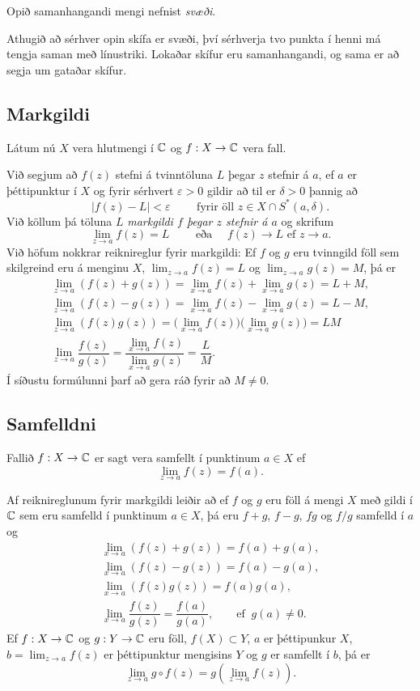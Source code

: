 Opið samanhangandi mengi nefnist {\it svæði}.  


Athugið að sérhver opin skífa er svæði, því sérhverja tvo punkta í
henni má
tengja saman með línustriki.  Lokaðar skífur eru samanhangandi,
og sama er að segja um gataðar skífur.


\subsection*{Markgildi}

Látum nú $X$ vera hlutmengi í ${\mathbb C}$ og $f:X\to {\mathbb C}$ vera fall.  

Við segjum að $f(z)$ stefni á tvinntöluna $L$ þegar  $z$ stefnir á
$a$,  ef $a$ er
þéttipunktur í $X$ og fyrir sérhvert $\varepsilon>0$ gildir að til er
$\delta>0$ þannig að 
$$
|f(z)-L|<\varepsilon \qquad \text{ fyrir öll } z\in X\cap S^*(a,\delta).
$$
Við köllum þá töluna $L$ {\it markgildi $f$ þegar $z$ stefnir á $a$}
og skrifum 
$$
\lim_{z\to a}f(z)=L  \qquad \text{ eða } \quad f(z)\to L \text{ ef }
z\to a.
$$
Við höfum nokkrar reiknireglur fyrir markgildi:  Ef $f$ og $g$ eru
tvinngild föll sem skilgreind eru á menginu $X$, $\lim_{z\to a}f(z)=L$
og $\lim_{z\to a}g(z)=M$, þá er 
\begin{gather*}
\lim_{z\to a}(f(z)+g(z))=\lim_{x\to a}f(z)+\lim_{x\to a}g(z)=L+M,\\
\lim_{z\to a}(f(z)-g(z))=\lim_{x\to a}f(z)-\lim_{x\to a}g(z)=L-M,\\
\lim_{z\to a}(f(z)g(z))=\big(\lim_{x\to a}f(z)\big)\big(\lim_{x\to
a}g(z)\big)=LM\\
\lim_{z\to a}\dfrac{f(z)}{g(z)}=\dfrac{\lim_{x\to a}f(z)}{\lim_{x\to
a}g(z)}=\dfrac LM.
\end{gather*}
Í síðustu formúlunni þarf að gera ráð fyrir að $M\neq 0$.



\subsection*{Samfelldni}

Fallið $f:X\to {\mathbb C}$ er sagt vera samfellt í punktinum $a\in X$ ef
$$
\lim_{z\to a}f(z)=f(a).
$$


Af reiknireglunum fyrir markgildi leiðir að ef $f$ og $g$ eru föll
á mengi $X$ með gildi í ${\mathbb C}$ sem eru samfelld í punktinum $a\in X$, þá
eru $f+g$, $f-g$, $fg$ og $f/g$ samfelld í $a$ og 
\begin{gather*}
\lim_{x\to a}(f(z)+g(z))=f(a)+g(a),\\
\lim_{x\to a}(f(z)-g(z))=f(a)-g(a),\\
\lim_{x\to a}(f(z)g(z))=f(a)g(a),\\
\lim_{x\to a}\dfrac{f(z)}{g(z)}=\dfrac{f(a)}{g(a)}, 
\qquad \text{ef } \ g(a)\neq 0.
\end{gather*}
Ef $f:X\to {\mathbb C}$ og $g:Y\to {\mathbb C}$ eru föll,  $f(X)\subset Y$,
$a$ er þéttipunkur $X$, $b=\lim_{z\to a}f(z)$ er
þéttipunktur mengisins $Y$ og $g$ er samfellt í $b$, þá er
$$
\lim_{z\to a} g\circ f(z)=g(\lim_{z\to a}f(z)).
$$



